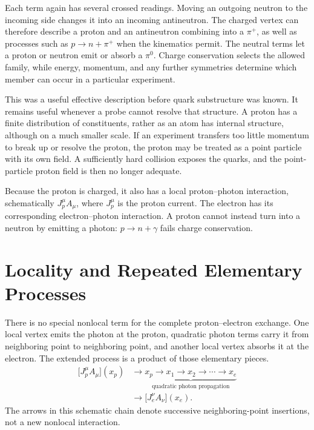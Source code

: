 Each term again has several crossed readings. Moving an outgoing neutron to the incoming side changes it into an incoming antineutron. The charged vertex can therefore describe a proton and an antineutron combining into a \(\pi^+\), as well as processes such as \(p\to n+\pi^+\) when the kinematics permit. The neutral terms let a proton or neutron emit or absorb a \(\pi^0\). Charge conservation selects the allowed family, while energy, momentum, and any further symmetries determine which member can occur in a particular experiment.

This was a useful effective description before quark substructure was known. It remains useful whenever a probe cannot resolve that structure. A proton has a finite distribution of constituents, rather as an atom has internal structure, although on a much smaller scale. If an experiment transfers too little momentum to break up or resolve the proton, the proton may be treated as a point particle with its own field. A sufficiently hard collision exposes the quarks, and the point-particle proton field is then no longer adequate.

Because the proton is charged, it also has a local proton--photon interaction, schematically \(J_p^\mu A_\mu\), where \(J_p^\mu\) is the proton current. The electron has its corresponding electron--photon interaction. A proton cannot instead turn into a neutron by emitting a photon: \(p\to n+\gamma\) fails charge conservation.

\begin{classroomqa}
\end{classroomqa}

\section{Locality and Repeated Elementary Processes}

There is no special nonlocal term for the complete proton--electron exchange. One local vertex emits the photon at the proton, quadratic photon terms carry it from neighboring point to neighboring point, and another local vertex absorbs it at the electron. The extended process is a product of those elementary pieces.
\begin{equation}
\begin{aligned}
\bigl[J_p^\mu A_\mu\bigr](x_p)
&\longrightarrow
\underbrace{x_p\to x_1\to x_2\to\cdots\to x_e}_{\text{quadratic photon propagation}}
\\
&\longrightarrow
\bigl[J_e^\nu A_\nu\bigr](x_e).
\end{aligned}
\end{equation}
The arrows in this schematic chain denote successive neighboring-point insertions, not a new nonlocal interaction.

